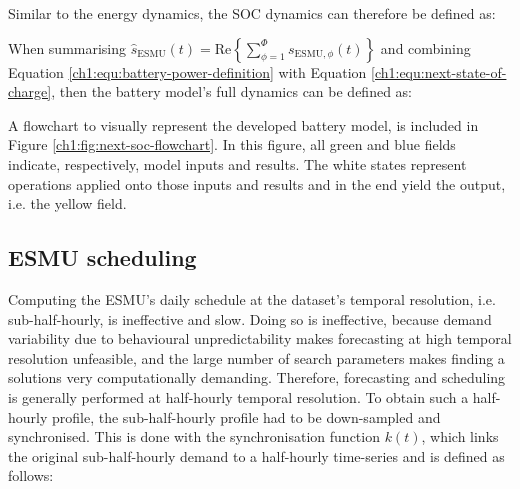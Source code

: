 

Similar to the energy dynamics, the SOC dynamics can therefore be defined as:



When summarising $\hat{s}_\text{ESMU}(t) = \text{Re}\left\{\sum_{\phi=1}^{\Phi}s_{\text{ESMU},\phi}(t)\right\}$ and combining Equation \ref{ch1:equ:battery-power-definition} with Equation \ref{ch1:equ:next-state-of-charge}, then the battery model's full dynamics can be defined as:



A flowchart to visually represent the developed battery model, is included in Figure \ref{ch1:fig:next-soc-flowchart}.
In this figure, all green and blue fields indicate, respectively, model inputs and results.
The white states represent operations applied onto those inputs and results and in the end yield the output, i.e. the yellow field.



\subsection{ESMU scheduling}
\label{ch1:subsec:esmu-scheduling}

Computing the ESMU's daily schedule at the dataset's temporal resolution, i.e. sub-half-hourly, is ineffective and slow.
Doing so is ineffective, because demand variability due to behavioural unpredictability makes forecasting at high temporal resolution unfeasible, and the large number of search parameters makes finding a solutions very computationally demanding.
Therefore, forecasting and scheduling is generally performed at half-hourly temporal resolution.
To obtain such a half-hourly profile, the sub-half-hourly profile had to be down-sampled and synchronised.
This is done with the synchronisation function $k(t)$, which links the original sub-half-hourly demand to a half-hourly time-series and is defined as follows:




